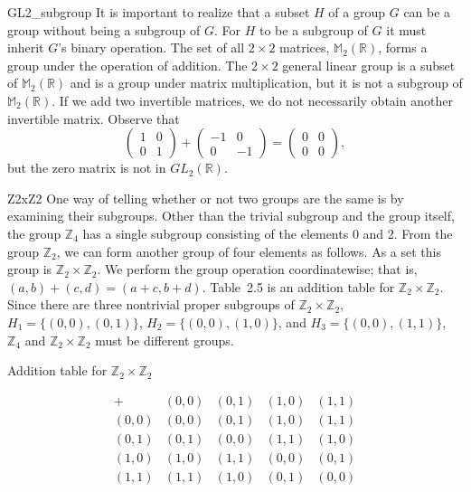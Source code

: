  
\begin{example}{GL2_subgroup}
It is important to realize that a subset $H$ of a group $G$ can be a
group without being a subgroup of $G$. For $H$ to be a subgroup of $G$
it must inherit $G$'s binary operation.  The set of all $2 \times 2$ 
matrices, ${\mathbb M}_2(\mathbb R)$, forms a group under the operation of
addition. The $2 \times 2$ general linear group is a subset of ${\mathbb
M}_2(\mathbb R)$ and is a group under matrix multiplication, but it is not a
subgroup of ${\mathbb M}_2(\mathbb R)$.  If we add two invertible matrices,
we do not necessarily obtain another invertible matrix. Observe that 
\[
\begin{pmatrix}
1 & 0 \\
0 & 1
\end{pmatrix}
+
\begin{pmatrix}
-1 &  0 \\
0  & -1
\end{pmatrix}
=
\begin{pmatrix}
0 & 0 \\
0 & 0
\end{pmatrix},
\]
but the zero matrix is not in $GL_2( {\mathbb R })$.
\end{example}
 
 
\begin{example}{Z2xZ2}
One way of telling whether or not two groups are the same is by
examining their subgroups.  Other than the trivial subgroup and the
group itself, the group ${\mathbb Z}_4$ has a single subgroup consisting
of the elements 0 and 2. From the group ${\mathbb Z}_2$, we can form
another group of four elements as follows.  As a set this group is
${\mathbb Z}_2 \times {\mathbb Z}_2$. We perform the group operation 
coordinatewise; that is, $(a,b) + (c,d) = (a+c, b+d)$. Table~2.5 is
an addition table for ${\mathbb Z}_2 \times {\mathbb Z}_2$. Since
there are three nontrivial proper subgroups of ${\mathbb Z}_2 \times
{\mathbb Z}_2$, $H_1 = \{ (0,0), (0,1) \}$, $H_2 = \{ (0,0), (1,0) \}$,
and $H_3 = \{ (0,0), (1,1) \}$, ${\mathbb Z}_4$ and ${\mathbb Z}_2 \times
{\mathbb Z}_2$ must be different groups.
\end{example}
 
 
\begin{table}[htb]\label{groups_table_Z2xZ2}
\caption{Addition table for ${\mathbb Z}_2 \times {\mathbb Z}_2$}{\small
\[
\begin{array}{c|cccc}
+     & (0,0) & (0,1) & (1,0) & (1,1) \\
\hline
(0,0) & (0,0) & (0,1) & (1,0) & (1,1) \\
(0,1) & (0,1) & (0,0) & (1,1) & (1,0) \\
(1,0) & (1,0) & (1,1) & (0,0) & (0,1) \\
(1,1) & (1,1) & (1,0) & (0,1) & (0,0)
\end{array}
\]
}
\end{table} 
 
